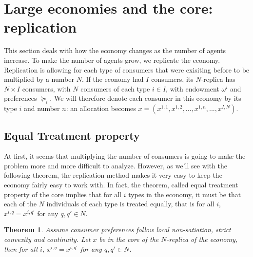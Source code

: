 \documentclass[12pt]{report}
\newtheorem{theorem}{Theorem}[chapter]
\begin{document}
\section{Large economies and the core: replication}

This section deals with how the economy changes as the number of agents increase. To make the number of agents grow, we replicate the economy. Replication is allowing for each type of consumers that were exisiting before to be multiplied by a number $N$. If the economy had $I$ consumers, its $N$-replica has $N\times I$ consumers, with $N$ consumers of each type $i\in I$, with endowment $\omega^i$ and preferences $\succeq_i$. We will therefore denote each consumer in this economy by its type $i$ and number $n$: an allocation becomes $x = (x^{1,1}, x^{1,2}, ..., x^{1,n}, ..., x^{I,N})$.

\subsection{Equal Treatment property}

At first, it seems that multiplying the number of consumers is going to make the problem more and more difficult to analyze. However, as we'll see with the following theorem, the replication method makes it very easy to keep the economy fairly easy to work with. In fact, the theorem, called equal treatment property of the core implies that for all $i$ types in the economy, it must be that each of the $N$ individuals of each type is treated equally, that is for all $i$, $x^{i,q} = x^{i,q'}$ for any $q,q'\in N$.

\begin{theorem}
Assume consumer preferences follow local non-satiation, strict convexity and continuity. Let $x$ be in the core of the $N$-replica of the economy, then for all $i$, $x^{i,q} = x^{i,q'}$ for any $q,q'\in N$.
\end{theorem}
\end{document}
